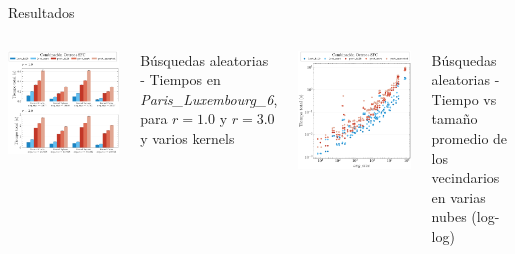 \documentclass[aspectratio=169]{beamer}
\begin{document}
\begin{frame}{Resultados}
    \vspace{-1em} %
    \begin{columns}[t] %
        \includegraphics[width=0.8\linewidth]{img/paris_luxembourg_6_subsets_reduced.pdf}
        {\scriptsize \centering Búsquedas aleatorias - Tiempos en \textit{Paris\_Luxembourg\_6}, para $r=1.0$ y $r=3.0$ y varios kernels \par}

            \includegraphics[width=0.8\linewidth]{img/loglog_subsets.pdf}
            {\scriptsize \centering Búsquedas aleatorias - Tiempo vs tamaño promedio de los vecindarios en varias nubes (log-log) \par}    \end{columns}
\end{frame}
\end{document}
